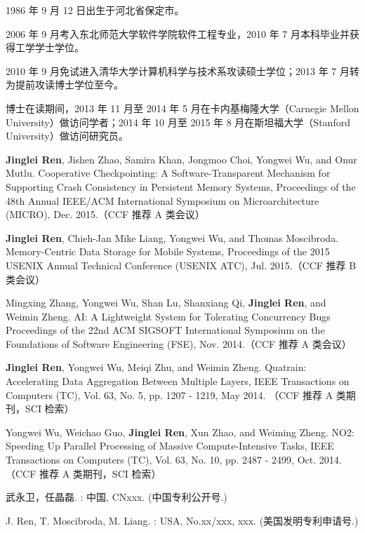 \begin{resume}


  1986 年 9 月 12 日出生于河北省保定市。

  2006 年 9 月考入东北师范大学软件学院软件工程专业，2010 年 7 月本科毕业并获得工学学士学位。

  2010 年 9 月免试进入清华大学计算机科学与技术系攻读硕士学位；2013 年 7 月转为提前攻读博士学位至今。

  博士在读期间，2013 年 11 月至 2014 年 5 月在卡内基梅隆大学（Carnegie Mellon University）做访问学者；2014 年 10 月至 2015 年 8 月在斯坦福大学（Stanford University）做访问研究员。

  \begin{publications}
  \item \textbf{Jinglei Ren}, Jishen Zhao, Samira Khan, Jongmoo Choi, Yongwei Wu, and Onur Mutlu.
Cooperative Checkpointing: A Software-Transparent Mechanism for Supporting Crash Consistency in Persistent Memory Systems, 
Proceedings of the 48th Annual IEEE/ACM International Symposium on Microarchitecture (MICRO), Dec. 2015.（CCF 推荐 A 类会议）
  \item \textbf{Jinglei Ren}, Chieh-Jan Mike Liang, Yongwei Wu, and Thomas Moscibroda.
Memory-Centric Data Storage for Mobile Systems, 
Proceedings of the 2015 USENIX Annual Technical Conference (USENIX ATC), Jul. 2015.（CCF 推荐 B 类会议）
  \item Mingxing Zhang, Yongwei Wu, Shan Lu, Shanxiang Qi, \textbf{Jinglei Ren}, and Weimin Zheng.
AI: A Lightweight System for Tolerating Concurrency Bugs 
Proceedings of the 22nd ACM SIGSOFT International Symposium on the Foundations of Software Engineering (FSE), Nov. 2014.（CCF 推荐 A 类会议）
  \item \textbf{Jinglei Ren}, Yongwei Wu, Meiqi Zhu, and Weimin Zheng.
Quatrain: Accelerating Data Aggregation Between Multiple Layers,
IEEE Transactions on Computers (TC), Vol. 63, No. 5, pp. 1207 - 1219, May 2014. （CCF 推荐 A 类期刊，SCI 检索）
  \item Yongwei Wu, Weichao Guo, \textbf{Jinglei Ren}, Xun Zhao, and Weiming Zheng.
NO2: Speeding Up Parallel Processing of Massive Compute-Intensive Tasks,
IEEE Transactions on Computers (TC), Vol. 63, No. 10, pp. 2487 - 2499, Oct. 2014.（CCF 推荐 A 类期刊，SCI 检索）
  \end{publications}

  \begin{achievements}
  \item 武永卫，任晶磊. : 中国, CNxxx. (中国专利公开号.)
  \item J. Ren, T. Moscibroda, M. Liang. : USA, No.xx/xxx, xxx. (美国发明专利申请号.)
  \end{achievements}
\end{resume}
